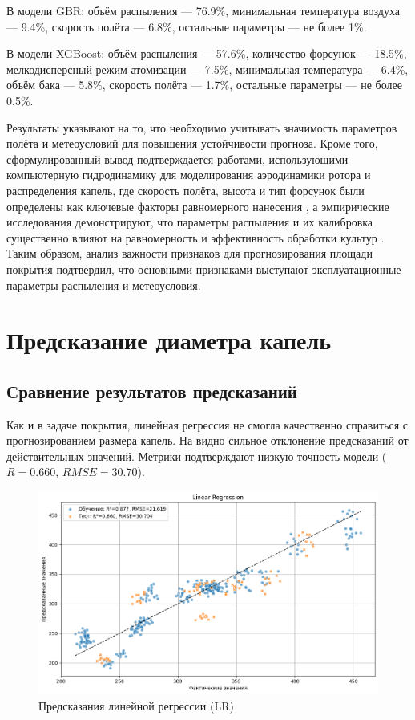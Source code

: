 В модели GBR: объём распыления --- 76.9\%, минимальная температура воздуха --- 9.4\%, скорость полёта --- 6.8\%, остальные параметры --- не более 1\%.

В модели XGBoost: объём распыления --- 57.6\%, количество форсунок --- 18.5\%, мелкодисперсный режим атомизации --- 7.5\%, минимальная температура --- 6.4\%, объём бака --- 5.8\%, скорость полёта --- 1.7\%, остальные параметры --- не более 0.5\%.

Результаты указывают на то, что необходимо учитывать значимость параметров полёта и метеоусловий для повышения устойчивости прогноза. Кроме того, сформулированный вывод подтверждается работами, использующими компьютерную гидродинамику для моделирования аэродинамики ротора и распределения капель, где скорость полёта, высота и тип форсунок были определены как ключевые факторы равномерного нанесения \cite{Liu2025}, а эмпирические исследования демонстрируют, что параметры распыления и их калибровка существенно влияют на равномерность и эффективность обработки культур \cite{Vitoria2022}. Таким образом, анализ важности признаков для прогнозирования площади покрытия подтвердил, что основными признаками выступают эксплуатационные параметры распыления и метеоусловия. 

\section{Предсказание диаметра капель}\label{ch3:droplet-size}

\subsection{Сравнение результатов предсказаний}

Как и в задаче покрытия, линейная регрессия не смогла качественно справиться с прогнозированием размера капель. На  видно сильное отклонение предсказаний от действительных значений. Метрики подтверждают низкую точность модели ($R = 0.660$, $RMSE = 30.70$).

\begin{figure}[htbp!]
	\centering
	\includegraphics[width=.9\linewidth]{my_folder/images/droplet_size/Linear-Regression.png}
	\caption{Предсказания линейной регрессии (LR)} 
	\label{fig:droplet-size-lr}  
\end{figure}

